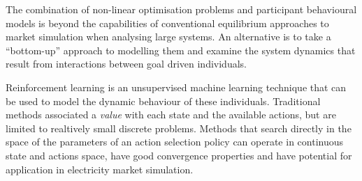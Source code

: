 The combination of non-linear optimisation problems and participant behavioural
models is beyond the capabilities of conventional equilibrium approaches to
market simulation when analysing large systems.  An alternative is to take a
``bottom-up'' approach to modelling them and examine the system dynamics that
result from interactions between goal driven individuals.

Reinforcement learning is an unsupervised machine learning technique that can
be used to model the dynamic behaviour of these individuals.  Traditional
methods associated a \textit{value} with each state and the available actions,
but are limited to realtively small discrete problems.  Methods that search
directly in the space of the parameters of an action selection policy can
operate in continuous state and actions space, have good convergence properties
and have potential for application in electricity market simulation.
